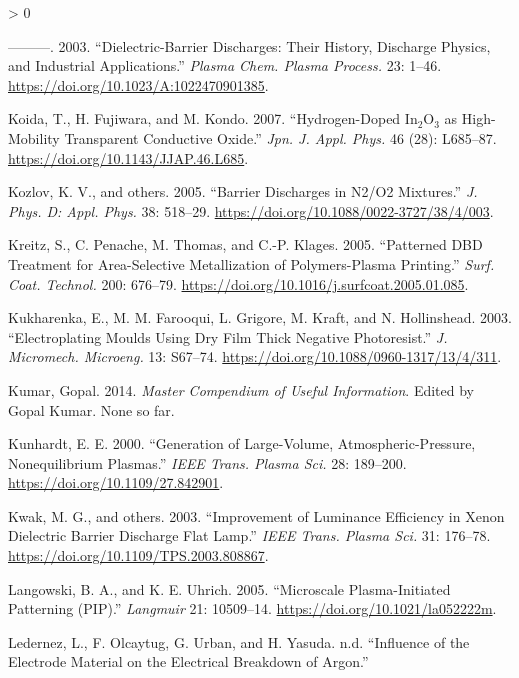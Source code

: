 \documentclass[
  10pt,
  twoside]{article}
\newlength{\cslhangindent}
\newenvironment{CSLReferences}[2] %
 {%
  \setlength{\parindent}{0pt}
  \ifodd #1 \everypar{\setlength{\hangindent}{\cslhangindent}}\ignorespaces\fi
  \ifnum #2 > 0
  \setlength{\parskip}{#2\baselineskip}
  \fi
 }%
 {}
\begin{document}
\begin{CSLReferences}{1}{0}
\leavevmode\hypertarget{ref-Kogel03}{}%
---------. 2003. {``Dielectric-Barrier Discharges: Their History, Discharge Physics, and Industrial Applications.''} \emph{Plasma Chem. Plasma Process.} 23: 1--46. \url{https://doi.org/10.1023/A:1022470901385}.

\leavevmode\hypertarget{ref-Koid07}{}%
Koida, T., H. Fujiwara, and M. Kondo. 2007. {``Hydrogen-Doped \(\mathrm{In_{2}O_{3}}\) as High-Mobility Transparent Conductive Oxide.''} \emph{Jpn. J. Appl. Phys.} 46 (28): L685--87. \url{https://doi.org/10.1143/JJAP.46.L685}.

\leavevmode\hypertarget{ref-Kozl05}{}%
Kozlov, K. V., and others. 2005. {``Barrier Discharges in {N2/O}2 Mixtures.''} \emph{J. Phys. D: Appl. Phys.} 38: 518--29. \url{https://doi.org/10.1088/0022-3727/38/4/003}.

\leavevmode\hypertarget{ref-Krei05}{}%
Kreitz, S., C. Penache, M. Thomas, and C.-P. Klages. 2005. {``Patterned {DBD} Treatment for Area-Selective Metallization of Polymers-Plasma Printing.''} \emph{Surf. Coat. Technol.} 200: 676--79. \url{https://doi.org/10.1016/j.surfcoat.2005.01.085}.

\leavevmode\hypertarget{ref-Kukh03}{}%
Kukharenka, E., M. M. Farooqui, L. Grigore, M. Kraft, and N. Hollinshead. 2003. {``Electroplating Moulds Using Dry Film Thick Negative Photoresist.''} \emph{J. Micromech. Microeng.} 13: S67--74. \url{https://doi.org/10.1088/0960-1317/13/4/311}.

\leavevmode\hypertarget{ref-gopal2014}{}%
Kumar, Gopal. 2014. \emph{Master Compendium of Useful Information}. Edited by Gopal Kumar. None so far.

\leavevmode\hypertarget{ref-Kunh00}{}%
Kunhardt, E. E. 2000. {``Generation of Large-Volume, Atmospheric-Pressure, Nonequilibrium Plasmas.''} \emph{IEEE Trans. Plasma Sci.} 28: 189--200. \url{https://doi.org/10.1109/27.842901}.

\leavevmode\hypertarget{ref-Kwak03}{}%
Kwak, M. G., and others. 2003. {``Improvement of Luminance Efficiency in Xenon Dielectric Barrier Discharge Flat Lamp.''} \emph{IEEE Trans. Plasma Sci.} 31: 176--78. \url{https://doi.org/10.1109/TPS.2003.808867}.

\leavevmode\hypertarget{ref-Lang05}{}%
Langowski, B. A., and K. E. Uhrich. 2005. {``Microscale Plasma-Initiated Patterning ({PIP}).''} \emph{Langmuir} 21: 10509--14. \url{https://doi.org/10.1021/la052222m}.

\leavevmode\hypertarget{ref-Lede08}{}%
Ledernez, L., F. Olcaytug, G. Urban, and H. Yasuda. n.d. {``Influence of the Electrode Material on the Electrical Breakdown of Argon.''}


\end{CSLReferences}
\end{document}
